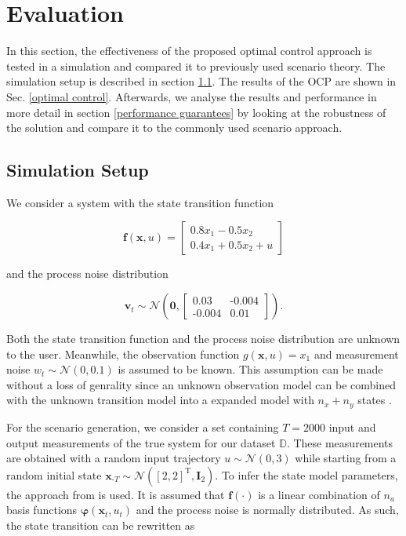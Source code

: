 \chapter{Evaluation} \label{Evaluation}

In this section, the effectiveness of the proposed optimal control approach is tested in a simulation and compared it to previously used scenario theory. The simulation setup is described in section \ref{Setup}. The results of the OCP are shown in Sec. \ref{optimal control}. Afterwards, we analyse the results and performance in more detail in section \ref{performance guarantees} by looking at the robustness of the solution and compare it to the commonly used scenario approach.

\section{Simulation Setup} \label{Setup}

We consider a system with the state transition function

\begin{equation}
\boldsymbol{f}(\boldsymbol{x}, u) = 
\begin{bmatrix}
0.8  x_1 - 0.5 x_2 \\
0.4 x_1 + 0.5 x_2 + u
\end{bmatrix}
\end{equation}

and the process noise distribution

\begin{equation}
\boldsymbol{v}_t \sim \mathcal{N} \left(\boldsymbol{0}, 
\begin{bmatrix}
0.03 & \text{-}0.004 \\
\text{-}0.004 & 0.01
\end{bmatrix}
\right).
\end{equation}

Both the state transition function and the process noise distribution are unknown to the user. Meanwhile, the observation function $g(\boldsymbol{x}, u) = x_1$ and measurement noise $w_t \sim \mathcal{N} (0, 0.1)$ is assumed to be known. This assumption can be made without a loss of genrality since an unknown observation model can be combined with the unknown transition model into a expanded model with $n_x + n_y$ states \cite{Frigola_15}.


For the scenario generation, we consider a set containing $T = 2000$ input and output measurements of the true system for our dataset $\mathbb{D}$. These measurements are obtained with a random input trajectory $u \sim \mathcal{N} (0, 3)$ while starting from a random initial state $\boldsymbol{x}_{\text{-}T} \sim \mathcal{N} ([2, 2]^\text{T}, \boldsymbol{I}_2)$. To infer the state model parameters, the approach from \cite{Svensson_17} is used. It is assumed that $\boldsymbol{f}(\cdot)$ is a linear combination of $n_a$ basis functions $\boldsymbol{\varphi}(\boldsymbol{x}_t, u_t)$ and the process noise is normally distributed. As such, the state transition can be rewritten as

